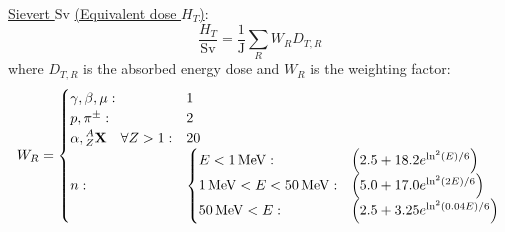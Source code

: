 		\href{https://en.wikipedia.org/wiki/Sievert}{Sievert $\mathrm{Sv}$} \href{https://en.wikipedia.org/wiki/Equivalent_dose}{(Equivalent dose $H_T$)}:
		\begin{equation}
			\frac{H_T}{\mathrm{Sv}} = \frac{1}{\mathrm{J}}\sum_R W_R D_{T,R}			
		\end{equation}
		where $D_{T,R}$ is the absorbed energy dose and $W_R$ is the weighting factor:
		\begin{equation}
			\begin{aligned}
				W_R =
				\begin{cases}
					\gamma,\beta,\mu: & 1 \\
					p, \pi^\pm: & 2 \\
					\alpha, \prescript{A}{Z}{\mathbf{X}}\quad\forall Z>1: & 20 \\
					n: &\begin{cases}
						E<1\,\mathrm{MeV}: & \qty(2.5+18.2 e^{\ln^2(E)/6}) \\
						1\,\mathrm{MeV} <E<50\,\mathrm{MeV}: & \qty(5.0+17.0 e^{\ln^2(2E)/6}) \\
						50\,\mathrm{MeV}<E: & \qty(2.5+3.25 e^{\ln^2(0.04E)/6}) \\
					\end{cases}
				\end{cases}\\
			\end{aligned}
		\end{equation}
